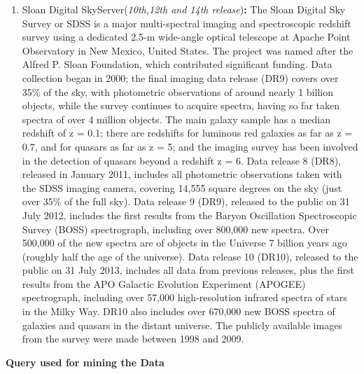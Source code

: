 \documentclass[11pt]{article}
\providecommand{\tightlist}{%
      \setlength{\itemsep}{0pt}\setlength{\parskip}{0pt}}
\begin{document}
\begin{enumerate}
\def\labelenumi{\arabic{enumi}.}
\setcounter{enumi}{2}
\tightlist
\item
  Sloan Digital SkyServer(\emph{10th,12th and 14th release})\textbf{:}
  The Sloan Digital Sky Survey or SDSS is a major multi-spectral imaging
  and spectroscopic redshift survey using a dedicated 2.5-m wide-angle
  optical telescope at Apache Point Observatory in New Mexico, United
  States. The project was named after the Alfred P. Sloan Foundation,
  which contributed significant funding. Data collection began in 2000;
  the final imaging data release (DR9) covers over 35\% of the sky, with
  photometric observations of around nearly 1 billion objects, while the
  survey continues to acquire spectra, having so far taken spectra of
  over 4 million objects. The main galaxy sample has a median redshift
  of z = 0.1; there are redshifts for luminous red galaxies as far as z
  = 0.7, and for quasars as far as z = 5; and the imaging survey has
  been involved in the detection of quasars beyond a redshift z = 6.
  Data release 8 (DR8), released in January 2011, includes all
  photometric observations taken with the SDSS imaging camera, covering
  14,555 square degrees on the sky (just over 35\% of the full sky).
  Data release 9 (DR9), released to the public on 31 July 2012, includes
  the first results from the Baryon Oscillation Spectroscopic Survey
  (BOSS) spectrograph, including over 800,000 new spectra. Over 500,000
  of the new spectra are of objects in the Universe 7 billion years ago
  (roughly half the age of the universe). Data release 10 (DR10),
  released to the public on 31 July 2013, includes all data from
  previous releases, plus the first results from the APO Galactic
  Evolution Experiment (APOGEE) spectrograph, including over 57,000
  high-resolution infrared spectra of stars in the Milky Way. DR10 also
  includes over 670,000 new BOSS spectra of galaxies and quasars in the
  distant universe. The publicly available images from the survey were
  made between 1998 and 2009. 
\end{enumerate}

    \textbf{Query used for mining the Data}
\end{document}
